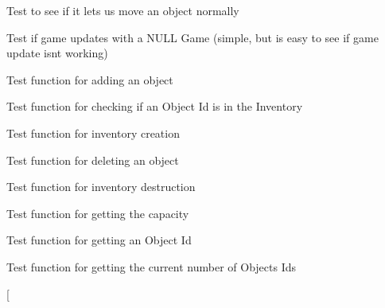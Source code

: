 \begin{DoxyRefList}
Test to see if it lets us move an object normally  
\item[\label{test__test000032}%
\hypertarget{test__test000032}{}%
Member \hyperlink{game__test_8h_acef689d23c451c738aab116984001501}{test1\+\_\+game\+\_\+update} ()]Test if game updates with a N\+U\+LL Game (simple, but is easy to see if game update isnt working)  
\item[\label{test__test000093}%
\hypertarget{test__test000093}{}%
Member \hyperlink{inventory__test_8h_ae81ec4669af03331ca8a228567736474}{test1\+\_\+inventory\+\_\+add} ()]Test function for adding an object  
\item[\label{test__test000114}%
\hypertarget{test__test000114}{}%
Member \hyperlink{inventory__test_8h_a94926e4449b777046515a173637bee84}{test1\+\_\+inventory\+\_\+check\+\_\+object} ()]Test function for checking if an Object Id is in the Inventory  
\item[\label{test__test000089}%
\hypertarget{test__test000089}{}%
Member \hyperlink{inventory__test_8h_a33638f1a88ae16ab8d6bee00145b82b8}{test1\+\_\+inventory\+\_\+create} ()]Test function for inventory creation  
\item[\label{test__test000097}%
\hypertarget{test__test000097}{}%
Member \hyperlink{inventory__test_8h_a0198822eb71da7d7e1a8742e6953c82c}{test1\+\_\+inventory\+\_\+del} ()]Test function for deleting an object  
\item[\label{test__test000091}%
\hypertarget{test__test000091}{}%
Member \hyperlink{inventory__test_8h_ab161eafe6a61db39b2237e97c677d822}{test1\+\_\+inventory\+\_\+destroy} ()]Test function for inventory destruction  
\item[\label{test__test000111}%
\hypertarget{test__test000111}{}%
Member \hyperlink{inventory__test_8h_a17c5d7d6ecb4161696deca0155e13f4f}{test1\+\_\+inventory\+\_\+get\+\_\+max\+\_\+objects} ()]Test function for getting the capacity  
\item[\label{test__test000105}%
\hypertarget{test__test000105}{}%
Member \hyperlink{inventory__test_8h_a7feab32c68817ece1716946f02738dc5}{test1\+\_\+inventory\+\_\+get\+\_\+object\+\_\+id} ()]Test function for getting an Object Id  
\item[\label{test__test000108}%
\hypertarget{test__test000108}{}%
Member \hyperlink{inventory__test_8h_a03ef2e867bad9b096df6047fcb22331e}{test1\+\_\+inventory\+\_\+get\+\_\+objects\+\_\+number} ()]Test function for getting the current number of Objects Ids  
\item[\label{test__test000117}%
\hypertarget{test__test000117}{}%

\end{DoxyRefList}
